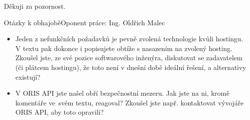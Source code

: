 \documentclass[aspectratio=169]{beamer}
\begin{document}
\begin{frame}
    Děkuji za pozornost.
\end{frame}

\appendix

\begin{frame}{Otázky k obhajobě}{Oponent práce: Ing. Oldřich Malec}
    \begin{itemize}
    \justifying
        \item Jeden z nefunkčních požadavků je pevně zvolená technologie kvůli hostingu. V textu pak dokonce i popisujete obtíže s nasazením na zvolený hosting. Zkoušel jste, ze své pozice softwarového inženýra, diskutovat se zadavatelem (či plátcem hostingu), že toto není v dnešní době ideální řešení, a alternativy existují?
        \item V ORIS API jste našel obří bezpečnostní mezeru. Jak jste na ni, kromě komentáře ve~svém textu, reagoval? Zkoušel jste např. kontaktovat vývojáře ORIS API, aby toto opravili?
    \end{itemize}
\end{frame}
\end{document}
